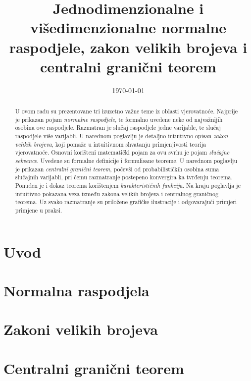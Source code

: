 \documentclass[11pt]{article}
\date{\today}
\title{Jednodimenzionalne i višedimenzionalne normalne raspodjele, zakon velikih
brojeva i centralni granični teorem}
\begin{document}
\maketitle
\newpage
\tableofcontents
\newpage

\begin{abstract}

  U ovom radu su prezentovane tri izuzetno važne teme iz oblasti vjerovatnoće.
  Najprije je prikazan pojam \textit{normalne raspodjele}, te formalno uvedene
  neke od najvažnijih osobina ove raspodjele. Razmatran je slučaj raspodjele
  jedne varijable, te slučaj raspodjele više varijabli. U narednom poglavlju je
  detaljno intuitivno opisan \textit{zakon velikih brojeva}, koji pomaže u
  intuitivnom shvatanju primjenjivosti teorija vjerovatnoće. Osnovni korišteni
  matematički pojam za ovu svrhu je pojam \textit{slučajne sekvence}. Uvedene su
  formalne definicije i formulisane teoreme. U narednom poglavlju je prikazan
  \textit{centralni granični teorem}, počevši od probabilističkih osobina suma
  slučajnih varijabli, pri čemu razmatranje postepeno konvergira ka tvrđenju
  teorema.  Ponuđen je i dokaz teorema korištenjem \textit{karakterističnih
  funkcija}. Na kraju poglavlja je intuitivno pokazana veza između zakona
  velikih brojeva i centralnog graničnog teorema. Uz svako razmatranje su
  priložene grafičke ilustracije i odgovarajući primjeri primjene u praksi.

\end{abstract}

\newpage
{}

\section{Uvod} \label{sec:intro}


\section{Normalna raspodjela} \label{sec:gauss}


\section{Zakoni velikih brojeva} \label{sec:lln}


\section{Centralni granični teorem} \label{sec:clt}

\end{document}
